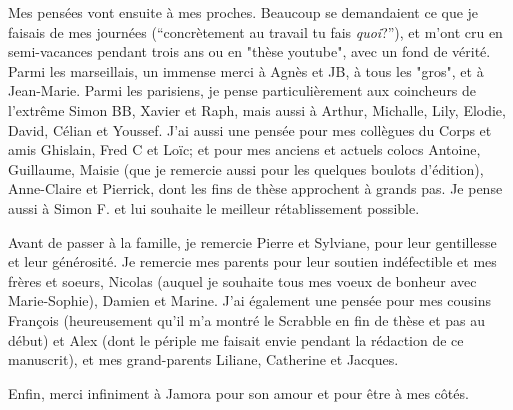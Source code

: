 Mes pensées vont ensuite à mes proches. 
Beaucoup se demandaient ce que je faisais de mes journées (``concrètement au travail tu fais \emph{quoi}?''), et m'ont cru en semi-vacances pendant trois ans ou en "thèse youtube", avec un fond de vérité. 
Parmi les marseillais, un immense merci à Agnès et JB, à tous les "gros", et à Jean-Marie.
Parmi les parisiens, je pense particulièrement aux coincheurs de l'extrême Simon BB, Xavier et Raph, mais aussi à Arthur, Michalle, Lily, Elodie, David, Célian et Youssef.
J'ai aussi une pensée pour mes collègues du Corps et amis Ghislain, Fred C et Loïc; et pour mes anciens et actuels colocs Antoine, Guillaume, Maisie (que je remercie aussi pour les quelques boulots d'édition), Anne-Claire et Pierrick, dont les fins de thèse approchent à grands pas.
Je pense aussi à Simon F. et lui souhaite le meilleur rétablissement possible.  
 
  
Avant de passer à la famille, je remercie Pierre et Sylviane, pour leur gentillesse et leur générosité.
Je remercie mes parents pour leur soutien indéfectible et mes frères et soeurs, Nicolas (auquel je souhaite tous mes voeux de bonheur avec Marie-Sophie), Damien et Marine.  
J'ai également une pensée pour mes cousins François (heureusement qu'il m'a montré le Scrabble en fin de thèse et pas au début) et Alex (dont le périple me faisait envie pendant la rédaction de ce manuscrit), et mes grand-parents Liliane, Catherine et Jacques.

Enfin, merci infiniment à Jamora pour son amour et pour être à mes côtés. 
  